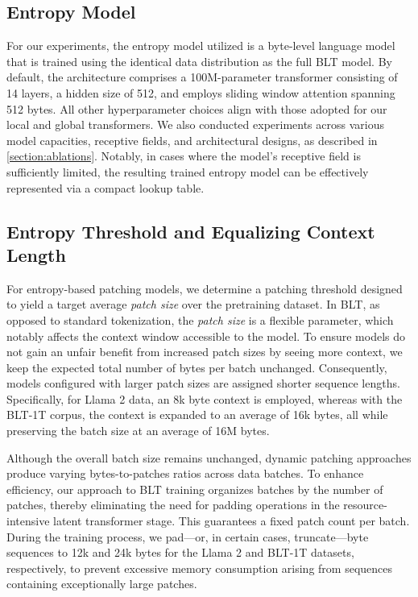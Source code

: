 \subsection{Entropy Model} For our experiments, the entropy model utilized is a byte-level language model that is trained using the identical data distribution as the full {\textsc BLT} model. By default, the architecture comprises a 100M-parameter transformer consisting of 14 layers, a hidden size of 512, and employs sliding window attention spanning 512 bytes. All other hyperparameter choices align with those adopted for our local and global transformers. We also conducted experiments across various model capacities, receptive fields, and architectural designs, as described in \autoref{section:ablations}. Notably, in cases where the model's receptive field is sufficiently limited, the resulting trained entropy model can be effectively represented via a compact lookup table.

\subsection{Entropy Threshold and Equalizing Context Length} For entropy-based patching models, we determine a patching threshold designed to yield a target average \textit{patch size} over the pretraining dataset. In {\textsc BLT}, as opposed to standard tokenization, the \textit{patch size} is a flexible parameter, which notably affects the context window accessible to the model. To ensure models do not gain an unfair benefit from increased patch sizes by seeing more context, we keep the expected total number of bytes per batch unchanged. Consequently, models configured with larger patch sizes are assigned shorter sequence lengths. Specifically, for Llama 2 data, an 8k byte context is employed, whereas with the {\textsc BLT}-1T corpus, the context is expanded to an average of 16k bytes, all while preserving the batch size at an average of 16M bytes.

Although the overall batch size remains unchanged, dynamic patching approaches produce varying bytes-to-patches ratios across data batches. To enhance efficiency, our approach to {\textsc BLT} training organizes batches by the number of patches, thereby eliminating the need for padding operations in the resource-intensive latent transformer stage. This guarantees a fixed patch count per batch. During the training process, we pad—or, in certain cases, truncate—byte sequences to 12k and 24k bytes for the Llama 2 and {\textsc BLT}-1T datasets, respectively, to prevent excessive memory consumption arising from sequences containing exceptionally large patches.

